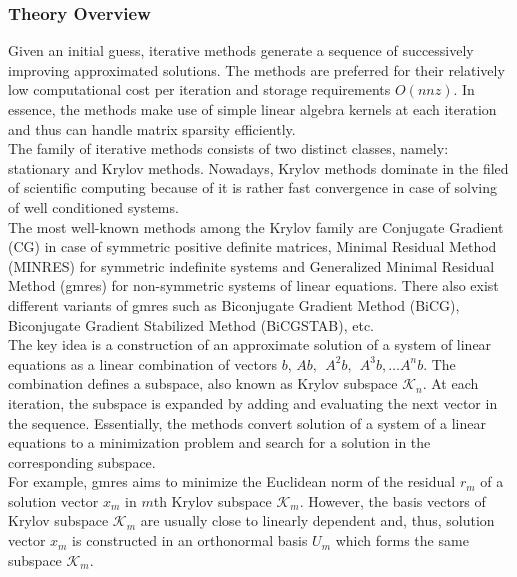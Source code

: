 \subsubsection{Theory Overview}
\label{subseq:iterative-theory}


Given an initial guess, iterative methods generate a sequence of successively improving approximated solutions. The methods are preferred for their relatively low computational cost per iteration and storage requirements $O(nnz)$. In essence, the methods make use of simple linear algebra kernels  at each iteration and thus can handle matrix sparsity efficiently.\\



The family of iterative methods consists of two distinct classes, namely: stationary and Krylov methods. Nowadays, Krylov methods dominate in the filed of scientific computing because of it is rather fast convergence in case of solving of well conditioned systems.\\


The most well-known methods among the Krylov family are Conjugate Gradient (CG) in case of symmetric positive definite matrices, Minimal Residual Method (MINRES) for symmetric indefinite systems and Generalized Minimal Residual Method (\gls{gmres}) for non-symmetric systems of linear equations. There also exist different variants of \gls{gmres} such as Biconjugate Gradient Method (BiCG), Biconjugate Gradient Stabilized Method (BiCGSTAB), etc.\\


The key idea is a construction of an approximate solution of a system of linear equations as a linear combination of vectors $b$, $Ab, \:\: A^2b, \:\: A^3b, \dots A^{n}b$. The combination defines a subspace, also known as Krylov subspace $\mathcal{K}_{n}$. At each iteration, the subspace is expanded by adding and evaluating the next vector in the sequence. Essentially, the methods convert solution of a system of a linear equations to a minimization problem and search for a solution in the corresponding subspace.\\


For example, \gls{gmres} aims to minimize the Euclidean norm of the residual $r_{m}$ of a solution vector $x_{m}$ in $m$th Krylov subspace $\mathcal{K}_{m}$. However, the basis vectors of Krylov subspace $\mathcal{K}_{m}$ are usually close to linearly dependent and, thus, solution vector $x_{m}$ is constructed in an orthonormal basis $U_{m}$ which forms the same subspace $\mathcal{K}_{m}$.\\


